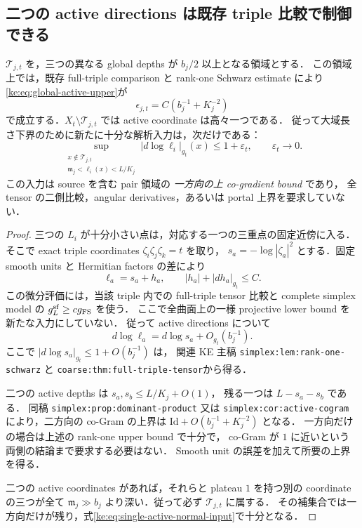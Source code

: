 \subsection{二つの active directions は既存 triple 比較で制御できる}

\begin{proposition}
\label{ke:global-lower-rank-one-reduction}
$\mathcal T_{j,t}$ を，三つの異なる global depths が $b_j/2$ 以上となる領域とする．
この領域上では，既存 full-triple comparison と rank-one Schwarz estimate により
\eqref{ke:eq:global-active-upper}が
\[
 \epsilon_{j,t}=C(b_j^{-1}+K_j^{-2})
\]
で成立する．$X_t\setminus\mathcal T_{j,t}$ では active coordinate は高々一つである．
従って大域長さ下界のために新たに十分な解析入力は，次だけである：
\begin{equation}\label{ke:eq:single-active-normal-input}
 \sup_{\substack{x\notin\mathcal T_{j,t}\\\mathfrak m_j<\ell_i(x)<L/K_j}}
       |d\log\ell_i|_{g_t}(x)\le1+\varepsilon_t,
 \qquad \varepsilon_t\longrightarrow0.
\end{equation}
この入力は source を含む pair 領域の \emph{一方向の上 co-gradient bound} であり，
全 tensor の二側比較，angular derivatives，あるいは portal 上界を要求していない．
\end{proposition}

\begin{proof}
三つの $L_i$ が十分小さい点は，対応する一つの三重点の固定近傍に入る．
そこで exact triple coordinates $\zeta_i\zeta_j\zeta_k=t$ を取り，
$s_a=-\log|\zeta_a|^2$ とする．固定 smooth units と Hermitian factors の差により
\[
 \ell_a=s_a+h_a,
 \qquad |h_a|+|dh_a|_{g_t}\le C.
\]
この微分評価には，当該 triple 内での full-triple tensor 比較と
complete simplex model の $g_L^{\rm sf}\ge c g_{\rm FS}$ を使う．
ここで全曲面上の一様 projective lower bound を新たな入力にしていない．
従って active directions について
\[
 d\log\ell_a=d\log s_a+O_{g_t}(b_j^{-1}).
\]
ここで $|d\log s_a|_{g_t}\le1+O(b_j^{-1})$ は，
関連 KE 主稿 \texttt{simplex:lem:rank-one-schwarz} と
\texttt{coarse:thm:full-triple-tensor}から得る．

二つの active depths は $s_a,s_b\le L/K_j+O(1)$，
残る一つは $L-s_a-s_b$ である．
同稿 \texttt{simplex:prop:dominant-product} 又は
\texttt{simplex:cor:active-cogram} により，二方向の co-Gram の上界は
$\mathrm{Id}+O(b_j^{-1}+K_j^{-2})$ となる．
一方向だけの場合は上述の rank-one upper bound で十分で，
co-Gram が $1$ に近いという両側の結論まで要求する必要はない．
Smooth unit の誤差を加えて所要の上界を得る．

二つの active coordinates があれば，それらと plateau $1$ を持つ別の coordinate
の三つが全て $\mathfrak m_j\gg b_j$ より深い．従って必ず $\mathcal T_{j,t}$ に属する．
その補集合では一方向だけが残り，式\eqref{ke:eq:single-active-normal-input}で十分となる．
\end{proof}

